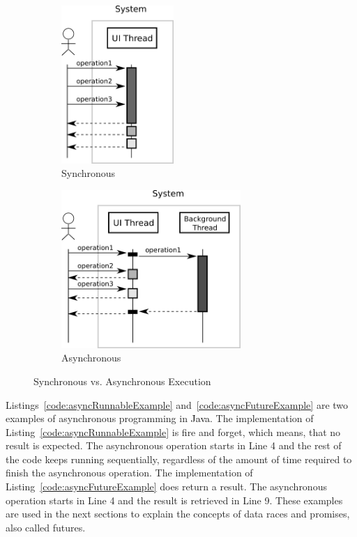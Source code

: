 \documentclass[type=bsc,accentcolor=tud9c]{tudthesis}
\newcommand{\framework}[1]{\textcolor{black}{#1}}
\begin{document}
\begin{figure}[h]
\begin{center}
\begin{subfigure}{0.4\textwidth}
\includegraphics[height=6cm]{asynchrony/sync.png}
\caption{Synchronous}
\label{fig:sync}
\end{subfigure}
\begin{subfigure}{0.4\textwidth}
\includegraphics[height=6cm]{asynchrony/async.png}
\caption{Asynchronous}
\label{fig:async}
\end{subfigure}
\end{center}
\caption{Synchronous vs. Asynchronous Execution}
\label{fig:sync-vs-async}
\end{figure}

Listings~\ref{code:asyncRunnableExample} and~\ref{code:asyncFutureExample} are two examples of asynchronous programming in \framework{Java}. The implementation of Listing~\ref{code:asyncRunnableExample} is fire and forget, which means, that no result is expected. The asynchronous operation starts in Line 4 and the rest of the code keeps running sequentially, regardless of the amount of time required to finish the asynchronous operation. The implementation of Listing~\ref{code:asyncFutureExample} does return a result. The asynchronous operation starts in Line 4 and the result is retrieved in Line 9. These examples are used in the next sections to explain the concepts of data races and promises, also called futures.
\end{document}
